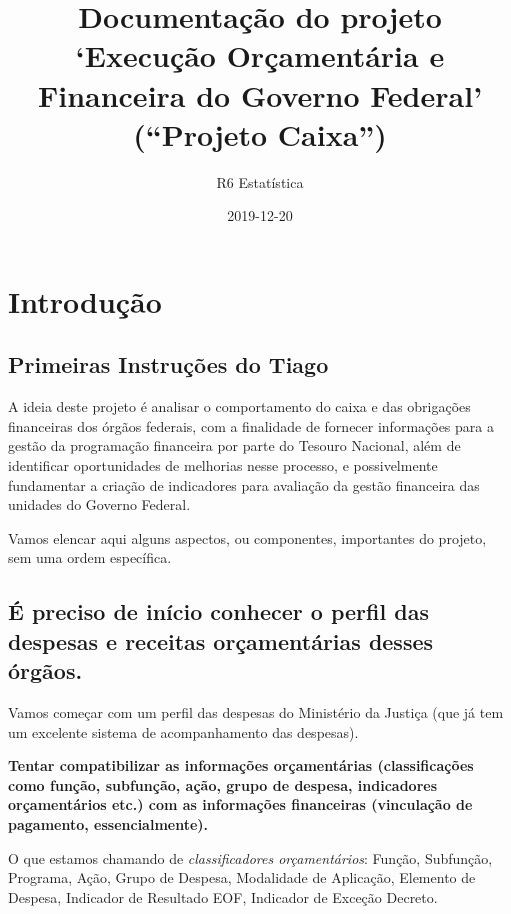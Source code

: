 \documentclass[]{book}
\title{Documentação do projeto `Execução Orçamentária e Financeira do Governo Federal' (``Projeto Caixa'')}
\author{R6 Estatística}
\date{2019-12-20}
\begin{document}
\maketitle

{
\setcounter{tocdepth}{1}
\tableofcontents
}
\hypertarget{introduuxe7uxe3o}{%
\chapter{Introdução}\label{introduuxe7uxe3o}}

\hypertarget{primeiras-instruuxe7uxf5es-do-tiago}{%
\section{Primeiras Instruções do Tiago}\label{primeiras-instruuxe7uxf5es-do-tiago}}

A ideia deste projeto é analisar o comportamento do caixa e das obrigações financeiras dos órgãos federais, com a finalidade de fornecer informações para a gestão da programação financeira por parte do Tesouro Nacional, além de identificar oportunidades de melhorias nesse processo, e possivelmente fundamentar a criação de indicadores para avaliação da gestão financeira das unidades do Governo Federal.

Vamos elencar aqui alguns aspectos, ou componentes, importantes do projeto, sem uma ordem específica.

\hypertarget{uxe9-preciso-de-inuxedcio-conhecer-o-perfil-das-despesas-e-receitas-oruxe7amentuxe1rias-desses-uxf3rguxe3os.}{%
\section{É preciso de início conhecer o perfil das despesas e receitas orçamentárias desses órgãos.}\label{uxe9-preciso-de-inuxedcio-conhecer-o-perfil-das-despesas-e-receitas-oruxe7amentuxe1rias-desses-uxf3rguxe3os.}}

Vamos começar com um perfil das despesas do Ministério da Justiça (que já tem um excelente sistema de acompanhamento das despesas).

\textbf{Tentar compatibilizar as informações orçamentárias (classificações como função, subfunção, ação, grupo de despesa, indicadores orçamentários etc.) com as informações financeiras (vinculação de pagamento, essencialmente).}

O que estamos chamando de \emph{classificadores orçamentários}: Função, Subfunção, Programa, Ação, Grupo de Despesa, Modalidade de Aplicação, Elemento de Despesa, Indicador de Resultado EOF, Indicador de Exceção Decreto.
\end{document}

